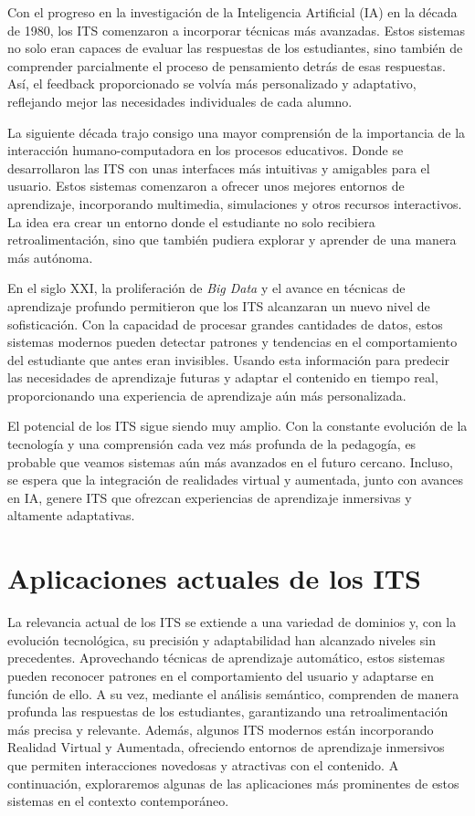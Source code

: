 Con el progreso en la investigación de la Inteligencia Artificial (IA) en la década de 1980, los ITS comenzaron a incorporar técnicas más avanzadas. Estos sistemas no solo eran capaces de evaluar las respuestas de los estudiantes, sino también de comprender parcialmente el proceso de pensamiento detrás de esas respuestas. Así, el feedback proporcionado se volvía más personalizado y adaptativo, reflejando mejor las necesidades individuales de cada alumno.

La siguiente década trajo consigo una mayor comprensión de la importancia de la interacción humano-computadora en los procesos educativos. Donde se desarrollaron las ITS con unas interfaces más intuitivas y amigables para el usuario. Estos sistemas comenzaron a ofrecer unos mejores entornos de aprendizaje, incorporando multimedia, simulaciones y otros recursos interactivos. La idea era crear un entorno donde el estudiante no solo recibiera retroalimentación, sino que también pudiera explorar y aprender de una manera más autónoma.

En el siglo XXI, la proliferación de \textit{Big Data} y el avance en técnicas de aprendizaje profundo permitieron que los ITS alcanzaran un nuevo nivel de sofisticación. Con la capacidad de procesar grandes cantidades de datos, estos sistemas modernos pueden detectar patrones y tendencias en el comportamiento del estudiante que antes eran invisibles. Usando esta información para predecir las necesidades de aprendizaje futuras y adaptar el contenido en tiempo real, proporcionando una experiencia de aprendizaje aún más personalizada.

El potencial de los ITS sigue siendo muy amplio. Con la constante evolución de la tecnología y una comprensión cada vez más profunda de la pedagogía, es probable que veamos sistemas aún más avanzados en el futuro cercano. Incluso, se espera que la integración de realidades virtual y aumentada, junto con avances en IA, genere ITS que ofrezcan experiencias de aprendizaje inmersivas y altamente adaptativas. 

\section{Aplicaciones actuales de los ITS}

La relevancia actual de los ITS se extiende a una variedad de dominios y, con la evolución tecnológica, su precisión y adaptabilidad han alcanzado niveles sin precedentes. Aprovechando técnicas de aprendizaje automático, estos sistemas pueden reconocer patrones en el comportamiento del usuario y adaptarse en función de ello. A su vez, mediante el análisis semántico, comprenden de manera profunda las respuestas de los estudiantes, garantizando una retroalimentación más precisa y relevante. Además, algunos ITS modernos están incorporando Realidad Virtual y Aumentada, ofreciendo entornos de aprendizaje inmersivos que permiten interacciones novedosas y atractivas con el contenido. A continuación, exploraremos algunas de las aplicaciones más prominentes de estos sistemas en el contexto contemporáneo.

